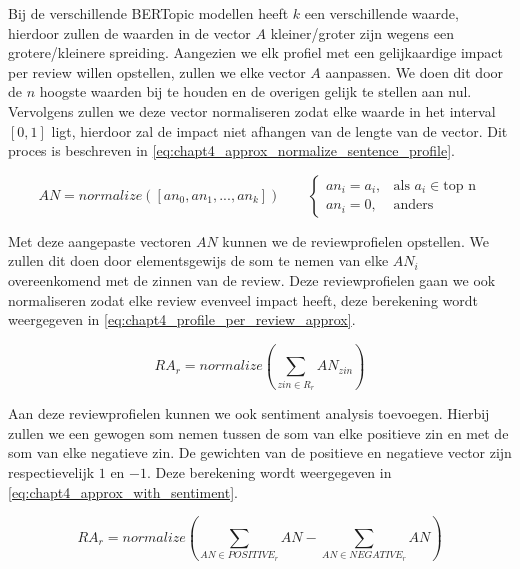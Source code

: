 
Bij de verschillende BERTopic modellen heeft $k$ een verschillende waarde, hierdoor zullen de waarden in de vector $A$ kleiner/groter zijn wegens een grotere/kleinere spreiding. Aangezien we elk profiel met een gelijkaardige impact per review willen opstellen, zullen we elke vector $A$ aanpassen. We doen dit door de $n$ hoogste waarden bij te houden en de overigen gelijk te stellen aan nul. Vervolgens zullen we deze vector normaliseren zodat elke waarde in het interval $[0,1]$ ligt, hierdoor zal de impact niet afhangen van de lengte van de vector. Dit proces is beschreven in \autoref{eq:chapt4_approx_normalize_sentence_profile}. 

\begin{equation}
AN = normalize([an_0, an_1, ..., an_k]) \;\;\;\;\;\;\;
\label{eq:chapt4_approx_normalize_sentence_profile}
\begin{cases}
    an_i = a_i, & \text{als } a_i \in \text{top n}  \\
    an_i = 0,   & \text{anders}
\end{cases}
\end{equation}

Met deze aangepaste vectoren $AN$ kunnen we de reviewprofielen opstellen. We zullen dit doen door elementsgewijs de som te nemen van elke $AN_i$ overeenkomend met de zinnen van de review. Deze reviewprofielen gaan we ook normaliseren zodat elke review evenveel impact heeft, deze berekening wordt weergegeven in \autoref{eq:chapt4_profile_per_review_approx}.

\begin{equation}
\label{eq:chapt4_profile_per_review_approx}
    RA_{r} = normalize(\sum_{zin \in R_r}AN_{zin})
\end{equation}

Aan deze reviewprofielen kunnen we ook sentiment analysis toevoegen. Hierbij zullen we een gewogen som nemen tussen de som van elke positieve zin en met de som van elke negatieve zin. De gewichten van de positieve en negatieve vector zijn respectievelijk $1$ en $-1$. Deze berekening wordt weergegeven in \autoref{eq:chapt4_approx_with_sentiment}.

\begin{equation}
\label{eq:chapt4_approx_with_sentiment}
    RA_{r} = normalize(\sum_{AN \in POSITIVE_{r}}{AN} - \sum_{AN \in NEGATIVE_{r}}{AN})
\end{equation}

